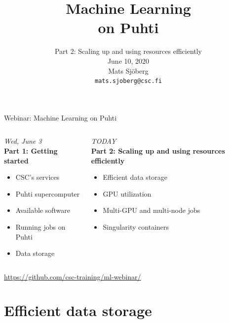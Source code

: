 \documentclass[aspectratio=1610,14pt]{beamer}
\title{Machine Learning\\on Puhti}
\subtitle{Part 2: Scaling up and using resources efficiently\\[5mm]
  June 10, 2020\\
  Mats Sjöberg\\
  {\tt mats.sjoberg@csc.fi}}
\newcommand{\link}[1]{\alert{\url{#1}}}
\begin{document}
\begin{frame}{Webinar: Machine Learning on Puhti}
  \begin{columns}[t]
    \begin{column}{0.45\linewidth}
      \vfill
      \hspace{15mm} {\em Wed, June 3} \\[5mm]

      \textbf{Part 1: Getting started}
      
      \begin{itemize}
      \item CSC's services
      \item Puhti supercomputer
      \item Available software
      \item Running jobs on Puhti
      \item Data storage
      \end{itemize}
    \end{column}
    \begin{column}{0.55\linewidth}
      \vfill
      \hspace{12mm} \alert{\em TODAY} \\[5mm]
      
      \textbf{Part 2: Scaling up and using resources efficiently}
      
      \begin{itemize}
      \item Efficient data storage
      \item GPU utilization
      \item Multi-GPU and multi-node jobs
      \item Singularity containers
      \end{itemize}
    \end{column}
  \end{columns}
  \vspace{10mm}
  \link{https://github.com/csc-training/ml-webinar/}
\end{frame}

\section{Efficient data storage}
\end{document}
